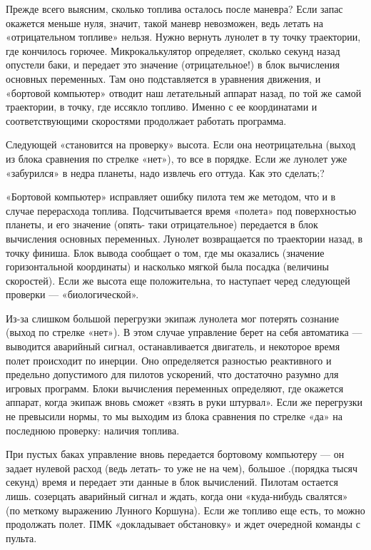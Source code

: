 \documentclass[11pt,a4paper,oneside]{article}
\begin{document}
Прежде всего выясним, сколько топлива осталось после маневра? Если запас окажется меньше нуля, значит, такой маневр невозможен, ведь летать на «отрицательном топливе» нельзя. Нужно вернуть лунолет в ту точку траектории, где кончилось горючее. Микрокалькулятор определяет, сколько секунд назад опустели баки, и передает это значение (отрицательное!) в блок вычисления основных переменных. Там оно подставляется в уравнения движения, и «бортовой компьютер» отводит наш летательный аппарат назад, по той же самой траектории, в точку, где иссякло топливо. Именно с ее координатами и соответствующими скоростями продолжает работать программа.

Следующей «становится на проверку» высота. Если она неотрицательна (выход из блока сравнения по стрелке «нет»), то все в порядке. Если же лунолет уже «забурился» в недра планеты, надо извлечь его оттуда. Как это сделать;?

«Бортовой компьютер» исправляет ошибку пилота тем же методом, что и в случае перерасхода топлива. Подсчитывается время «полета» под поверхностью планеты, и его значение (опять- таки отрицательное) передается в блок вычисления основных переменных. Лунолет возвращается по траектории назад, в точку финиша. Блок вывода сообщает о том, где мы оказались (значение горизонтальной координаты) и насколько мягкой была посадка (величины скоростей). Если же высота еще положительна, то наступает черед следующей проверки — «биологической».

Из-за слишком большой перегрузки экипаж лунолета мог потерять сознание (выход по стрелке «нет»). В этом случае управление берет на себя автоматика — выводится аварийный сигнал, останавливается двигатель, и некоторое время полет происходит по инерции. Оно определяется разностью реактивного и предельно допустимого для пилотов ускорений, что достаточно разумно для игровых программ. Блоки вычисления переменных определяют, где окажется аппарат, когда экипаж вновь сможет «взять в руки штурвал». Если же перегрузки не превысили нормы, то мы выходим из блока сравнения по стрелке «да» на последнюю проверку: наличия топлива.

При пустых баках управление вновь передается бортовому компьютеру — он задает нулевой расход (ведь летать- то уже не на чем), большое .(порядка тысяч секунд) время и передает эти данные в блок вычислений. Пилотам остается лишь. созерцать аварийный сигнал и ждать, когда они «куда-нибудь свалятся» (по меткому выражению Лунного Коршуна). Если же топливо еще есть, то можно продолжать полет. ПМК «докладывает обстановку» и ждет очередной команды с пульта.
\end{document}
